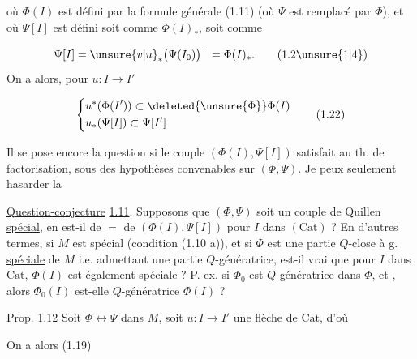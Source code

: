 où $\Phi(I)$ est défini par la formule générale
(1.11) (où $\Psi$ est remplacé par $\Phi$), et où
$\Psi[I]$ est défini soit comme $\Phi(I)_*$,
soit comme

\[
\Psi[I]=\unsure{v|u}_*\big(\Psi(I_0)\big)^{-}=\Phi(I)_*.\tag*{(1.2\unsure{1|4})}
\]
On a alors, pour $u:I\longrightarrow I'$

\[
\left\{\begin{aligned}
&u^*(\Phi(I'))\subset\deleted{\unsure{\Phi}}\Phi(I)\\
&u_*(\Psi[I])\subset\Psi[I']
\end{aligned}\right.\tag*{(1.22)}
\]

Il se pose encore la question si le couple
$(\Phi(I),\Psi[I])$ satisfait au  th. de factorisation,
sous des hypothèses convenables sur $(\Phi,\Psi)$.
Je peux seulement hasarder la

\uline{Question-conjecture} \uline{1.11}. Supposons que
\deleted{$(\Phi,\unsure{\Psi}$} $(\Phi,\Psi)$ soit un couple de Quillen
\uline{spécial}, en est-il de $=$ de $(\Phi(I),\Psi[I])$
pour  $I$ dans $(\mathrm{Cat})$ ?  En d'autres
termes, si  $M$ est spécial
(condition (1.10 a)), et si $\Phi$ est une
partie $Q$-close à g. \uline{spéciale} de $M$ i.e.
admettant une  partie $Q$-génératrice,
est-il vrai que pour  $I$ dans $\mathrm{Cat}$,
$\Phi(I)$ est également spéciale ?
P. ex. si $\Phi_0$
est $Q$-génératrice dans $\Phi$, et , alors
$\Phi_0(I)$ est-elle $Q$-génératrice  $\Phi(I)$ ?

\uline{Prop. 1.12} Soit $\Phi\longleftrightarrow\Psi$ dans $M$, soit $u:I\longrightarrow I'$
une flèche de $\mathrm{Cat}$, d'où


On a alors (1.19) 

